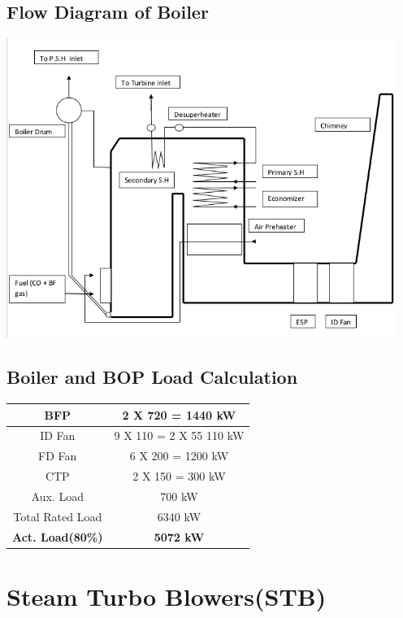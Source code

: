 \documentclass[english,11pt]{report}
\begin{document}
\section{Flow Diagram of Boiler}
\begin{center}
\includegraphics[width =5in]{flow}
\end{center}
    




\section{Boiler and BOP Load Calculation}
\begin{center}
\begin{tabular}{|c|c|}
\hline
  BFP & 2 X 720  = 1440 kW \\ \hline
  ID Fan & 9 X 110 = 2 X 55 110 kW \\ \hline
  FD Fan & 6 X 200 = 1200 kW \\ \hline
  CTP & 2 X 150 = 300 kW\\ \hline
  Aux. Load & 700 kW \\ \hline
  Total Rated Load & 6340 kW \\ \hline
  \textbf{Act. Load(80\%)} & \textbf{5072 kW}\\
  \hline
  
\end{tabular}
\end{center}


\chapter{Steam Turbo Blowers(STB)}
\end{document}

